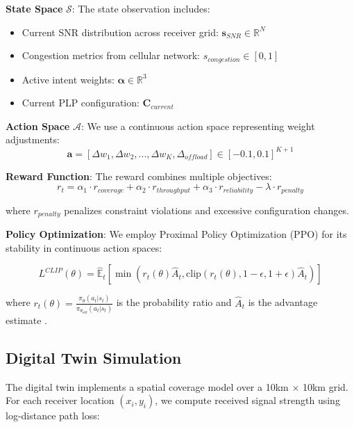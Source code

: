 \documentclass[conference]{IEEEtran}
\begin{document}
\textbf{State Space} $\mathcal{S}$: The state observation includes:
\begin{itemize}
\item Current SNR distribution across receiver grid: $\mathbf{s}_{SNR} \in \mathbb{R}^{N}$
\item Congestion metrics from cellular network: $s_{congestion} \in [0,1]$
\item Active intent weights: $\boldsymbol{\alpha} \in \mathbb{R}^3$
\item Current PLP configuration: $\mathbf{C}_{current}$
\end{itemize}

\textbf{Action Space} $\mathcal{A}$: We use a continuous action space representing weight adjustments:
\begin{equation}
\mathbf{a} = [\Delta w_1, \Delta w_2, ..., \Delta w_K, \Delta_{offload}] \in [-0.1, 0.1]^{K+1}
\end{equation}

\textbf{Reward Function}: The reward combines multiple objectives:
\begin{equation}
r_t = \alpha_1 \cdot r_{coverage} + \alpha_2 \cdot r_{throughput} + \alpha_3 \cdot r_{reliability} - \lambda \cdot r_{penalty}
\end{equation}

where $r_{penalty}$ penalizes constraint violations and excessive configuration changes.

\textbf{Policy Optimization}: We employ Proximal Policy Optimization (PPO) \cite{b9} for its stability in continuous action spaces:

\begin{equation}
L^{CLIP}(\theta) = \hat{\mathbb{E}}_t \left[ \min(r_t(\theta)\hat{A}_t, \text{clip}(r_t(\theta), 1-\epsilon, 1+\epsilon)\hat{A}_t) \right]
\end{equation}

where $r_t(\theta) = \frac{\pi_\theta(a_t|s_t)}{\pi_{\theta_{old}}(a_t|s_t)}$ is the probability ratio and $\hat{A}_t$ is the advantage estimate \cite{b15}.

\subsection{Digital Twin Simulation}

The digital twin implements a spatial coverage model over a 10km × 10km grid. For each receiver location $(x_i, y_i)$, we compute received signal strength using log-distance path loss:
\end{document}
